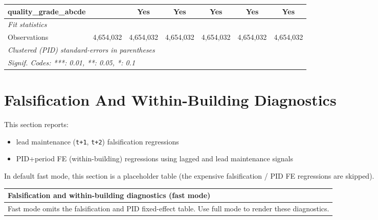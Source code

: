 \documentclass[
  11pt,
]{article}
\providecommand{\tightlist}{%
  \setlength{\itemsep}{0pt}\setlength{\parskip}{0pt}}
\begin{document}
\begin{adjustbox}{max width=\textwidth}
\begin{tabular}{lcccccc}
   quality\_grade\_abcde        &                & Yes            & Yes            & Yes            & Yes            & Yes\\  
   \midrule
   \emph{Fit statistics}\\
   Observations                 & 4,654,032      & 4,654,032      & 4,654,032      & 4,654,032      & 4,654,032      & 4,654,032\\  
   \midrule \midrule
   \multicolumn{7}{l}{\emph{Clustered (PID) standard-errors in parentheses}}\\
   \multicolumn{7}{l}{\emph{Signif. Codes: ***: 0.01, **: 0.05, *: 0.1}}\\
\end{tabular}
\par\endgroup



\end{adjustbox}

\section{Falsification And Within-Building
Diagnostics}\label{falsification-and-within-building-diagnostics}

This section reports:

\begin{itemize}
\tightlist
\item
  lead maintenance (\texttt{t+1}, \texttt{t+2}) falsification
  regressions
\item
  PID+period FE (within-building) regressions using lagged and lead
  maintenance signals
\end{itemize}

In default fast mode, this section is a placeholder table (the expensive
falsification / PID FE regressions are skipped).

\begin{adjustbox}{max width=\textwidth}
\begingroup
\centering
\begin{tabular}{p{}}
\toprule
\textbf{Falsification and within-building diagnostics (fast mode)}\\
\midrule
Fast mode omits the falsification and PID fixed-effect table. Use full mode to render these diagnostics.\\
\bottomrule
\end{tabular}
\par\endgroup

\end{adjustbox}
\end{document}
